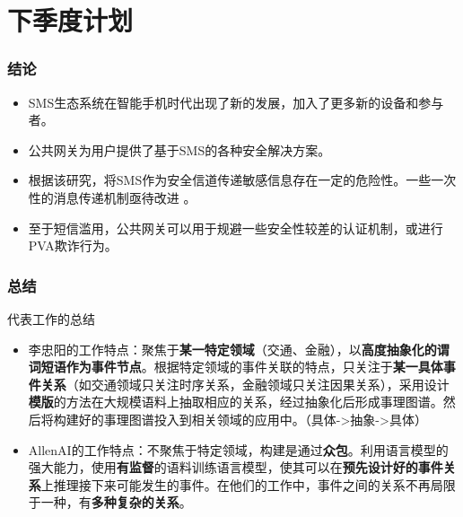 \documentclass[10pt,aspectratio=43,mathserif]{beamer}
\begin{document}
\section[计划]{下季度计划}


		\begin{frame}
		  \frametitle{\textbf{结论}}
		
		  \begin{itemize}
		    \item SMS生态系统在智能手机时代出现了新的发展，加入了更多新的设备和参与者。
		    \item 公共网关为用户提供了基于SMS的各种安全解决方案。
            \item 根据该研究，将SMS作为安全信道传递敏感信息存在一定的危险性。一些一次性的消息传递机制亟待改进 \cite{Liao0ZNC18}。
            \item 至于短信滥用，公共网关可以用于规避一些安全性较差的认证机制，或进行PVA欺诈行为\cite{Liao0ZNC18}。
		  \end{itemize}
		\end{frame}
		
        \begin{frame}
            \frametitle{\textbf{总结}}
            \begin{block}{代表工作的总结}
                \begin{itemize}
                    \item 李忠阳的工作特点：聚焦于\textbf{某一特定领域}（交通、金融），以\textbf{高度抽象化的谓词短语作为事件节点}。根据特定领域的事件关联的特点，只关注于\textbf{某一具体事件关系}（如交通领域只关注时序关系，金融领域只关注因果关系），采用设计\textbf{模版}的方法在大规模语料上抽取相应的关系，经过抽象化后形成事理图谱。然后将构建好的事理图谱投入到相关领域的应用中。（具体->抽象->具体）
                    \item AllenAI的工作特点：不聚焦于特定领域，构建是通过\textbf{众包}。利用语言模型的强大能力，使用\textbf{有监督}的语料训练语言模型，使其可以在\textbf{预先设计好的事件关系}上推理接下来可能发生的事件。在他们的工作中，事件之间的关系不再局限于一种，有\textbf{多种复杂的关系}。
                \end{itemize}

            \end{block}
        \end{frame}
        
\end{document}
